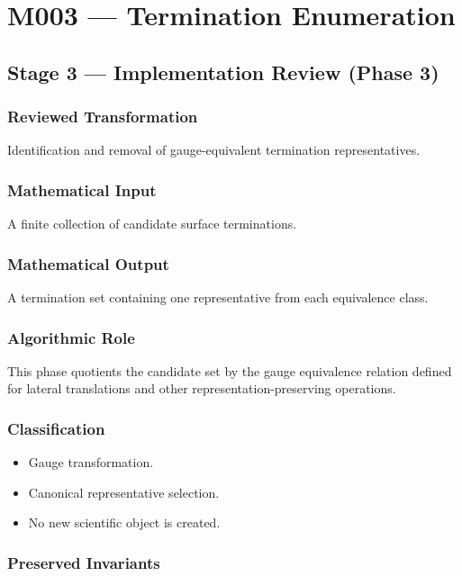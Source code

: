 \chapter{M003 --- Termination Enumeration}

\section{Stage 3 --- Implementation Review (Phase 3)}

\subsection{Reviewed Transformation}

Identification and removal of gauge-equivalent termination
representatives.

\subsection{Mathematical Input}

A finite collection of candidate surface terminations.

\subsection{Mathematical Output}

A termination set containing one representative from each equivalence
class.

\subsection{Algorithmic Role}

This phase quotients the candidate set by the gauge equivalence relation
defined for lateral translations and other representation-preserving
operations.

\subsection{Classification}

\begin{itemize}
\item Gauge transformation.
\item Canonical representative selection.
\item No new scientific object is created.
\end{itemize}

\subsection{Preserved Invariants}

